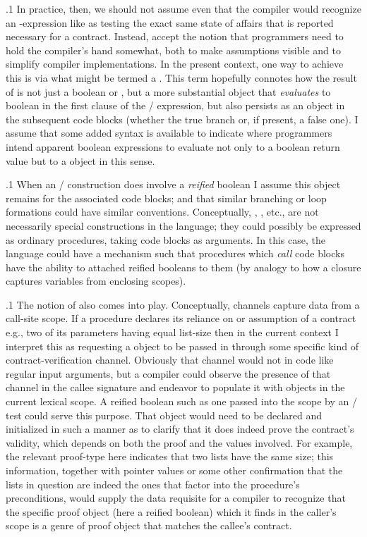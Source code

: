 \documentclass[11pt, twocolumn]{article}
\begin{document}
\p.1{%
In practice, then, we should not assume even that the compiler would recognize an
-expression like  as testing the exact same state of affairs
that is reported necessary for a contract. Instead, accept the notion
that programmers need to hold the compiler's hand somewhat, both to make
assumptions visible and to simplify compiler implementations. In the present
context, one way to achieve this is via what might be termed a .
This term hopefully connotes how the result of  is not just a boolean
 or , but a more substantial object that \textit{evaluates} to boolean
in the first clause of the / expression, but also persists as an
object in the subsequent code blocks (whether the true branch or, if present,
a false one). I assume that some added syntax is available to indicate where
programmers intend apparent boolean expressions
to evaluate not only to a boolean return value but to a  object in this sense.
}%

\p.1{%
When an / construction does involve a \textit{reified} boolean I assume
this object remains  for the associated code blocks; and
that similar branching or loop formations could have similar
conventions. Conceptually, , , etc., are not
necessarily special constructions in the language;
they could possibly be expressed as ordinary procedures, taking
code blocks as arguments. In this case, the language could
have a mechanism such that procedures which \textit{call} code blocks
have the ability to attached reified booleans to them (by
analogy to how a closure captures variables from enclosing scopes).
}%

\p.1{%
The notion of  also comes into play.
Conceptually, channels capture data from a call-site scope. If a procedure
declares its reliance on or assumption of a contract \mdash{} e.g.,
two of its parameters having equal list-size \mdash{} then in the
current context I interpret this as requesting a 
object to be passed in through some specific kind of contract-verification
channel. Obviously that channel would not  in code
like regular input arguments, but a compiler could observe the
presence of that channel in the callee signature and endeavor
to populate it with objects in the current lexical scope.
A reified boolean such as one passed into the scope
by an / test could serve this purpose.
That object would need to be declared and initialized in such a
manner as to clarify that it does indeed prove the contract's
validity, which depends on both the proof  and
the values involved. For example, the relevant proof-type
here indicates that two lists have the same size; this
information, together with pointer values or some other
confirmation that the lists in question are indeed the
ones that factor into the procedure's preconditions,
would supply the data requisite for a compiler to
recognize that the specific proof object (here a reified boolean)
which it finds in the caller's scope is a genre of
proof object that matches the callee's contract.
}%
\end{document}
